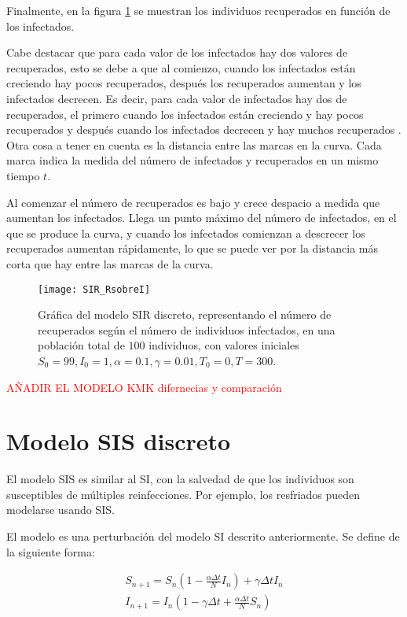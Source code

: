 Finalmente, en la figura \ref{fig: SIR_RsobreI} se muestran los individuos recuperados en función de los infectados.

Cabe destacar que para cada valor de los infectados hay dos valores de recuperados, esto se debe a que al comienzo, cuando los infectados están creciendo hay pocos recuperados, después los recuperados aumentan y los infectados decrecen. Es decir, para cada valor de infectados hay dos de recuperados, el primero cuando los infectados están creciendo y hay pocos recuperados y después cuando los infectados decrecen y hay muchos recuperados . Otra cosa a tener en cuenta es la distancia entre las marcas en la curva. Cada marca indica la medida del número de infectados y recuperados en un mismo tiempo $t$.

Al comenzar el número de recuperados es bajo y crece despacio a medida que aumentan los infectados. Llega un punto máximo del número de infectados, en el que se produce la curva, y cuando los infectados comienzan a descrecer los recuperados aumentan rápidamente, lo que se puede ver por la distancia más corta que hay entre las marcas de la curva.

\begin{figure}
\begin{center}

\caption{Gráfica del modelo SIR discreto, representando el número de recuperados según el número de individuos infectados, en una población total de $100$ individuos, con valores iniciales $S_0=99, I_0 = 1, \alpha = 0.1, \gamma=0.01, T_0 = 0, T = 300$.}
\label{fig: SIR_RsobreI}
\texttt{[image: SIR\_RsobreI]}
\end{center}
\end{figure}

\textcolor{red}{AÑADIR EL MODELO KMK difernecias y comparación}


\section{Modelo SIS discreto}
El modelo SIS es similar al SI, con la salvedad de que los individuos son susceptibles de múltiples reinfecciones.
Por ejemplo, los resfriados pueden modelarse usando SIS.

El modelo es una perturbación del modelo SI descrito anteriormente. Se define de la siguiente forma:

\begin{equation}
\label{eqn: modelo_SIS}
\begin{aligned}
S_{n+1} = S_n \left(1-\frac{\alpha\Delta t}{N} I_n \right) + \gamma \Delta t I_n \\
I_{n+1} = I_n \left( 1-\gamma \Delta t + \frac{\alpha\Delta t}{N} S_n \right)
\end{aligned}
\end{equation}

